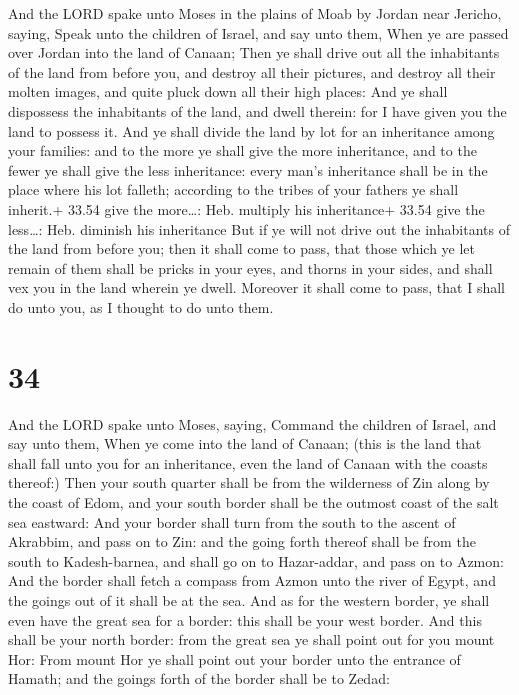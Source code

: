  And the LORD spake unto Moses in the plains of Moab by
Jordan near Jericho, saying,  Speak unto the children of
Israel, and say unto them, When ye are passed over Jordan into the land
of Canaan;  Then ye shall drive out all the inhabitants of
the land from before you, and destroy all their pictures, and destroy
all their molten images, and quite pluck down all their high places:
 And ye shall dispossess the inhabitants of the land, and
dwell therein: for I have given you the land to possess it.
 And ye shall divide the land by lot for an inheritance
among your families: and to the more ye shall give the more inheritance,
and to the fewer ye shall give the less inheritance: every man's
inheritance shall be in the place where his lot falleth; according to
the tribes of your fathers ye shall inherit.+ 33.54 give the more\ldots:
Heb. multiply his inheritance+ 33.54 give the less\ldots: Heb. diminish
his inheritance  But if ye will not drive out the
inhabitants of the land from before you; then it shall come to pass,
that those which ye let remain of them shall be pricks in your eyes, and
thorns in your sides, and shall vex you in the land wherein ye dwell.
 Moreover it shall come to pass, that I shall do unto you,
as I thought to do unto them.

\hypertarget{section-33}{%
\section{34}\label{section-33}}

 And the LORD spake unto Moses, saying,  Command
the children of Israel, and say unto them, When ye come into the land of
Canaan; (this is the land that shall fall unto you for an inheritance,
even the land of Canaan with the coasts thereof:)  Then your
south quarter shall be from the wilderness of Zin along by the coast of
Edom, and your south border shall be the outmost coast of the salt sea
eastward:  And your border shall turn from the south to the
ascent of Akrabbim, and pass on to Zin: and the going forth thereof
shall be from the south to Kadesh-barnea, and shall go on to
Hazar-addar, and pass on to Azmon:  And the border shall
fetch a compass from Azmon unto the river of Egypt, and the goings out
of it shall be at the sea.  And as for the western border,
ye shall even have the great sea for a border: this shall be your west
border.  And this shall be your north border: from the great
sea ye shall point out for you mount Hor:  From mount Hor ye
shall point out your border unto the entrance of Hamath; and the goings
forth of the border shall be to Zedad:

